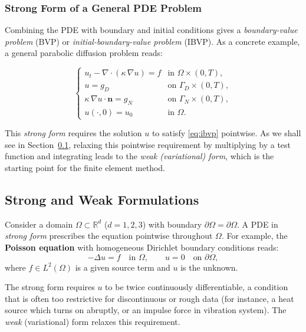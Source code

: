 \documentclass[11pt]{article}
\newcommand{\R}{\mathbb{R}}
\newcommand{\Lapl}{\Delta}
\newcommand{\domain}{\Omega}
\newcommand{\boundary}{\partial\Omega}
\begin{document}
\subsubsection{Strong Form of a General PDE Problem}

Combining the PDE with boundary and initial conditions gives a
\emph{boundary-value problem} (BVP) or
\emph{initial-boundary-value problem} (IBVP).
As a concrete example, a general parabolic diffusion problem reads:

\begin{equation}
  \label{eq:ibvp}
  \begin{cases}
    u_t - \nabla\cdot(\kappa\,\nabla u) = f
      & \text{in } \domain\times(0,T), \\[4pt]
    u = g_D
      & \text{on } \Gamma_D\times(0,T), \\[4pt]
    \kappa\,\nabla u\cdot\mathbf{n} = g_N
      & \text{on } \Gamma_N\times(0,T), \\[4pt]
    u(\cdot,0) = u_0
      & \text{in } \domain.
  \end{cases}
\end{equation}

This \emph{strong form} requires the solution $u$ to satisfy
\eqref{eq:ibvp} pointwise.
As we shall see in Section~\ref{subsec:strong-weak}, relaxing this
pointwise requirement by multiplying by a test function and integrating
leads to the \emph{weak (variational) form}, which is the starting point
for the finite element method.

\subsection{Strong and Weak Formulations}
\label{subsec:strong-weak}

Consider a domain $\domain \subset \R^d$ ($d = 1, 2, 3$) with boundary
$\boundary = \partial\domain$.
A PDE in \emph{strong form} prescribes the equation pointwise throughout
$\domain$.
For example, the \textbf{Poisson equation} with homogeneous Dirichlet boundary
conditions reads:
\begin{equation}
  \label{eq:poisson-strong}
  -\Lapl u = f \quad \text{in } \domain, \qquad
  u = 0 \quad \text{on } \boundary,
\end{equation}
where $f \in L^2(\domain)$ is a given source term and $u$ is the unknown.

The strong form requires $u$ to be twice continuously differentiable, a
condition that is often too restrictive for discontinuous or rough data (for instance, a heat source which turns on abruptly, or an impulse force in vibration system).
The \emph{weak} (variational) form relaxes this requirement.
\end{document}
